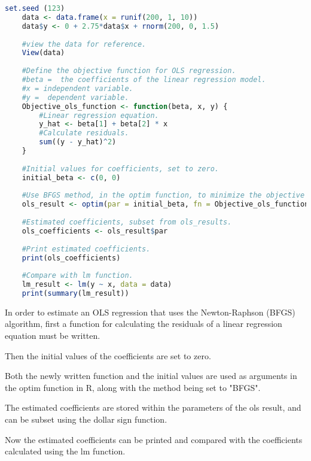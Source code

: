 \documentclass[12pt,letterpaper]{article}
\begin{document}
 \begin{lstlisting}[language=R]
 	set.seed (123)
 	data <- data.frame(x = runif(200, 1, 10))
 	data$y <- 0 + 2.75*data$x + rnorm(200, 0, 1.5)
 	
 	#view the data for reference.
 	View(data)
 	
 	#Define the objective function for OLS regression.
 	#beta =  the coefficients of the linear regression model.
 	#x = independent variable.
 	#y =  dependent variable.
 	Objective_ols_function <- function(beta, x, y) {
 		#Linear regression equation.
 		y_hat <- beta[1] + beta[2] * x
 		#Calculate residuals.
 		sum((y - y_hat)^2)
 	}
 	
 	#Initial values for coefficients, set to zero.
 	initial_beta <- c(0, 0)
 	
 	#Use BFGS method, in the optim function, to minimize the objective function.
 	ols_result <- optim(par = initial_beta, fn = Objective_ols_function, x = data$x, y = data$y, method = "BFGS")
 	
 	#Estimated coefficients, subset from ols_results.
 	ols_coefficients <- ols_result$par
 	
 	#Print estimated coefficients.
 	print(ols_coefficients)
 	
 	#Compare with lm function.
 	lm_result <- lm(y ~ x, data = data)
 	print(summary(lm_result))
 	 \end{lstlisting}

In order to estimate an OLS regression that uses the Newton-Raphson (BFGS) algorithm, first a function for calculating the residuals of a linear regression equation must be written.

\vspace{0.5cm}

Then the initial values of the coefficients are set to zero.

\vspace{0.5cm}

Both the newly written function and the initial values are used as arguments in the optim function in R, along with the method being set to "BFGS".

\vspace{0.5cm}

The estimated coefficients are stored within the parameters of the ols result, and can be subset using the dollar sign function.

\vspace{0.5cm}

Now the estimated coefficients can be printed and compared with the coefficients calculated using the lm function.
\end{document}
